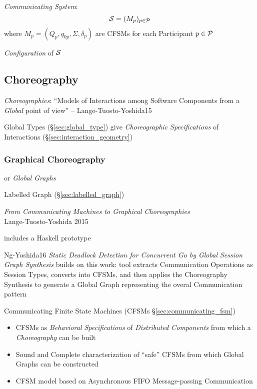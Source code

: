 \emph{Communicating System}:
\[
  \mathcal{S} = (M_p)_{p \in \mathcal{P}}
\]
where $M_p = (Q_p, q_{0p}, \Sigma, \delta_p)$ are CFSMs for each
Participant $p \in \mathcal{P}$

\emph{Configuration} of $\mathcal{S}$ %



\subsection{Choreography}\label{sec:choreography}

\emph{Choreographies}: ``Models of Interactions among Software
Components from a \emph{Global} point of view'' --
Lange-Tuosto-Yoshida15

\fist Global Types (\S\ref{sec:global_type}) give \emph{Choreographic
  Specifications} of Interactions (\S\ref{sec:interaction_geometry})



\subsubsection{Graphical Choreography}\label{sec:graphical_choreography}

or \emph{Global Graphs}

\fist Labelled Graph (\S\ref{sec:labelled_graph})

\begingroup

\newcommand{\party}{\mono}

\emph{From Communicating Machines to Graphical Choreographies} \\
Lange-Tuosto-Yoshida 2015

includes a Haskell prototype

Ng-Yoshida16 \emph{Static Deadlock Detection for Concurrent Go by
  Global Session Graph Synthesis} builds on this work: tool extracts
Communication Operations as Session Types, converts into CFSMs, and
then applies the Choreography Synthesis to generate a Global Graph
representing the overal Communication pattern

\fist Communicating Finite State Machines (CFSMs
\S\ref{sec:communicating_fsm})

\begin{itemize}
\item CFSMs as \emph{Behavioral Specifications} of \emph{Distributed
  Components} from which a \emph{Choreography} can be built
\item Sound and Complete characterization of ``safe'' CFSMs from which
  Global Graphs can be constructed
\item CFSM model based on Asynchronous FIFO Message-passing
  Communication
\end{itemize}


